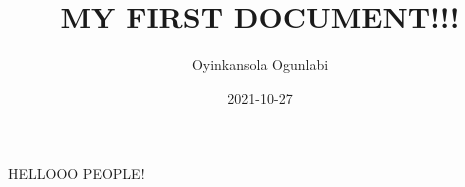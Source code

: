 \documentclass{article}
\title{MY FIRST DOCUMENT!!!}
\date{2021-10-27}
\author{Oyinkansola Ogunlabi}
\begin{document}
	\maketitle
	\newpage
	HELLOOO
	PEOPLE!
\end{document}
